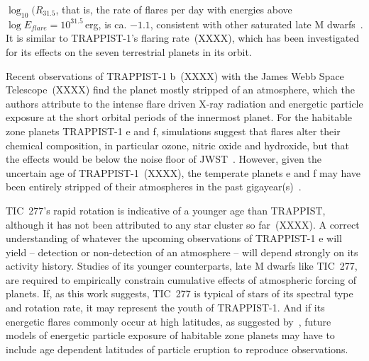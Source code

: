 \documentclass[twocolumn]{aastex631}
\begin{document}
$\log_{10}(R_{31.5}$, that is, the rate of flares per day with energies above $\log E_{flare}=10^{31.5}\,$erg, is ca. $-1.1$, consistent with other saturated late M dwarfs~\citep{medina2020flare, murray2022study}. It is similar to TRAPPIST-1's flaring rate~(XXXX), which has been investigated for its effects on the seven terrestrial planets in its orbit. 

Recent observations of TRAPPIST-1 b~(XXXX) with the James Webb Space Telescope~(XXXX) find the planet mostly stripped of an atmosphere, which the authors attribute to the intense flare driven X-ray radiation and energetic particle exposure at the short orbital periods of the innermost planet. For the habitable zone planets TRAPPIST-1 e and f, simulations suggest that flares alter their chemical composition, in particular ozone, nitric oxide and hydroxide, but that the effects would be below the noise floor of JWST~\citep{chen2021persistence}. However, given the uncertain age of TRAPPIST-1~(XXXX), the temperate planets e and f may have been entirely stripped of their atmospheres in the past gigayear(s)~\citep{garraffo2017threatening}. 

TIC~277's rapid rotation is indicative of a younger age than TRAPPIST, although it has not been attributed to any star cluster so far~(XXXX). A correct understanding of whatever the upcoming observations of TRAPPIST-1 e will yield -- detection or non-detection of an atmosphere -- will depend strongly on its activity history. Studies of its younger counterparts, late M dwarfs like TIC~277, are required to empirically constrain cumulative effects of atmospheric forcing of planets. If, as this work suggests, TIC~277 is typical of stars of its spectral type and rotation rate, it may represent the youth of TRAPPIST-1. And if its energetic flares commonly occur at high latitudes, as suggested by~\citet{ilin2021giant}, future models of energetic particle exposure of habitable zone planets may have to include age dependent latitudes of particle eruption to reproduce observations. 
 

\end{document}
